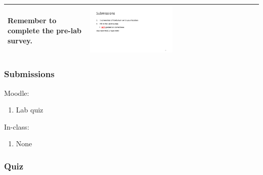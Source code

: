 \documentclass[12pt]{article}
\begin{document}
\begin{longtable}{|m{}|m{}|}

Remember to complete the pre-lab survey. & \includegraphics[width=0.5\textwidth]{ppt/lab01/Slide15.jpeg}\\\hline
\end{longtable}


\subsubsection{Submissions}

Moodle:
\begin{enumerate}
\item Lab quiz
\end{enumerate}

\noindent
In-class:
\begin{enumerate}
\item None
\end{enumerate}


\subsubsection{Quiz}
\end{document}
